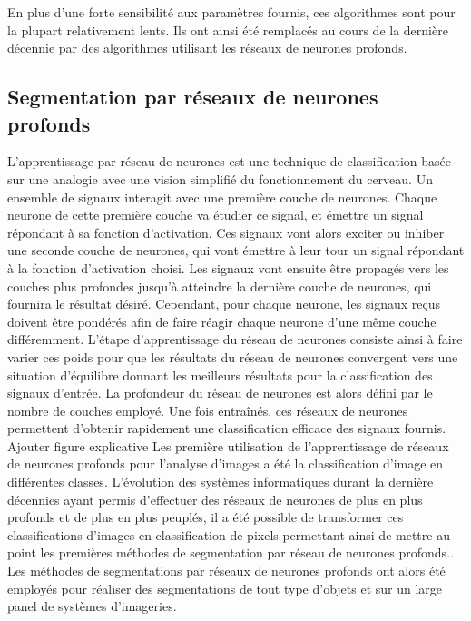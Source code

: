 \documentclass[\main/main.tex]{subfiles}
\begin{document}
%
En plus d'une forte sensibilité aux paramètres fournis, ces algorithmes sont pour la plupart relativement lents.
%
Ils ont ainsi été remplacés au cours de la dernière décennie par des algorithmes utilisant les réseaux de neurones profonds.

    \subsection{Segmentation par réseaux de neurones profonds}

%
L'apprentissage par réseau de neurones est une technique de classification basée sur une analogie avec une vision simplifié du fonctionnement du cerveau.
%
Un ensemble de signaux interagit avec une première couche de neurones.
%
Chaque neurone de cette première couche va étudier ce signal, et émettre un signal répondant à sa fonction d'activation.
%
Ces signaux vont alors exciter ou inhiber une seconde couche de neurones, qui vont émettre à leur tour un signal répondant à la fonction d'activation choisi.
%
Les signaux vont ensuite être propagés vers les couches plus profondes jusqu'à atteindre la dernière couche de neurones, qui fournira le résultat désiré.
%
Cependant, pour chaque neurone, les signaux reçus doivent être pondérés afin de faire réagir chaque neurone d'une même couche différemment.
%
L'étape d'apprentissage du réseau de neurones consiste ainsi à faire varier ces poids pour que les résultats du réseau de neurones convergent vers une situation d'équilibre donnant les meilleurs résultats pour la classification des signaux d'entrée.
%
La profondeur du réseau de neurones est alors défini par le nombre de couches employé.
%
Une fois entraînés, ces réseaux de neurones permettent d'obtenir rapidement une classification efficace des signaux fournis.
\color{magenta}Ajouter figure explicative\color{black}
%
Les première utilisation de l'apprentissage de réseaux de neurones profonds pour l'analyse d'images a été la classification d'image en différentes classes\cite{lecun_1989,krizhevsky_2017,Simonyan_2014}.
%
L'évolution des systèmes informatiques durant la dernière décennies ayant permis d'effectuer des réseaux de neurones de plus en plus profonds et de plus en plus peuplés, il a été possible de transformer ces classifications d'images en classification de pixels permettant ainsi de mettre au point les premières méthodes de segmentation par réseau de neurones profonds.\cite{ronneberger_2015,milletari_2016}.
%
Les méthodes de segmentations par réseaux de neurones profonds ont alors été employés pour réaliser des segmentations de tout type d'objets et sur un large panel de systèmes d'imageries\cite{zhao_2019,xie_2020,xu_2020,zhang_2020,khan_2020,zhang_2019a}.
\end{document}
